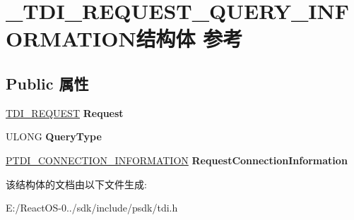 \hypertarget{struct___t_d_i___r_e_q_u_e_s_t___q_u_e_r_y___i_n_f_o_r_m_a_t_i_o_n}{}\section{\+\_\+\+T\+D\+I\+\_\+\+R\+E\+Q\+U\+E\+S\+T\+\_\+\+Q\+U\+E\+R\+Y\+\_\+\+I\+N\+F\+O\+R\+M\+A\+T\+I\+O\+N结构体 参考}
\label{struct___t_d_i___r_e_q_u_e_s_t___q_u_e_r_y___i_n_f_o_r_m_a_t_i_o_n}
\subsection*{Public 属性}
\begin{DoxyCompactItemize}
\item 
\mbox{\label{struct___t_d_i___r_e_q_u_e_s_t___q_u_e_r_y___i_n_f_o_r_m_a_t_i_o_n_a9ebb9530796aa0c3b14e1f4f7295f9f9}} 
\hyperlink{struct___t_d_i___r_e_q_u_e_s_t}{T\+D\+I\+\_\+\+R\+E\+Q\+U\+E\+ST} {\bfseries Request}
\item 
\mbox{\label{struct___t_d_i___r_e_q_u_e_s_t___q_u_e_r_y___i_n_f_o_r_m_a_t_i_o_n_a948562d13c30a5b764bcbc64aaf24c86}} 
U\+L\+O\+NG {\bfseries Query\+Type}
\item 
\mbox{\label{struct___t_d_i___r_e_q_u_e_s_t___q_u_e_r_y___i_n_f_o_r_m_a_t_i_o_n_a68b534808ca661d146836548c84d1f94}} 
\hyperlink{struct___t_d_i___c_o_n_n_e_c_t_i_o_n___i_n_f_o_r_m_a_t_i_o_n}{P\+T\+D\+I\+\_\+\+C\+O\+N\+N\+E\+C\+T\+I\+O\+N\+\_\+\+I\+N\+F\+O\+R\+M\+A\+T\+I\+ON} {\bfseries Request\+Connection\+Information}
\end{DoxyCompactItemize}


该结构体的文档由以下文件生成\+:\begin{DoxyCompactItemize}
\item 
E\+:/\+React\+O\+S-\/0../sdk/include/psdk/tdi.\+h\end{DoxyCompactItemize}
